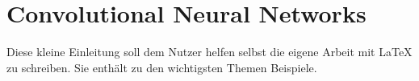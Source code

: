 \chapter{Convolutional Neural Networks}

Diese kleine Einleitung soll dem Nutzer helfen selbst die eigene Arbeit mit \LaTeX{} zu schreiben. Sie enthält zu den wichtigsten Themen Beispiele.


